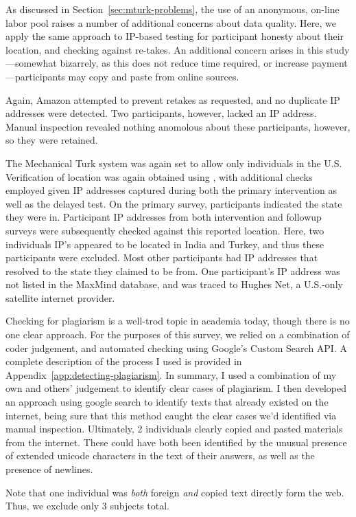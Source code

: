 As discussed in Section~\ref{sec:mturk-problems}, the use of an anonymous,
on-line labor pool raises a number of additional concerns about data quality.
Here, we apply the same approach to IP-based testing for participant honesty
about their location, and checking against re-takes.  An additional concern
arises in this study---somewhat bizarrely, as this does not reduce time
required, or increase payment---participants may copy and paste from online
sources.

Again, Amazon attempted to prevent retakes as requested, and no duplicate IP
addresses were detected. Two participants, however, lacked an IP address.
Manual inspection revealed nothing anomolous about these participants, however,
so they were retained.

The Mechanical Turk system was again set to allow only individuals in the U.S.
Verification of location was again obtained using \textcite{maxmind-database},
with additional checks employed given IP addresses captured during both the
primary intervention as well as the delayed test.  On the primary survey,
participants indicated the state they were in.  Participant IP addresses from
both intervention and followup surveys were subsequently checked against this
reported location. Here, two individuals IP’s appeared to be located in India
and Turkey, and thus these participants were excluded. Most other participants
had IP addresses that resolved to the state they claimed to be from. One
participant’s IP address was not listed in the MaxMind database, and was traced
to Hughes Net, a U.S.-only satellite internet provider.

Checking for plagiarism is a well-trod topic in academia today, though there is
no one clear approach. For the purposes of this survey, we relied on a
combination of coder judgement, and automated checking using Google’s Custom
Search API. A complete description of the process I used is provided in
Appendix~\ref{app:detecting-plagiarism}. In summary, I used a combination of my
own and others' judgement to identify clear cases of plagiarism. I then
developed an approach using google search to identify texts that already existed
on the internet, being sure that this method caught the clear cases we’d
identified via manual inspection. Ultimately, 2 individuals clearly 
copied and pasted materials from the internet. These could have both been
identified by the unusual presence of extended unicode characters in the text of
their answers, as well as the presence of newlines.

Note that one individual was \emph{both} foreign \emph{and} copied text directly
form the web. Thus, we exclude only 3 subjects total.

